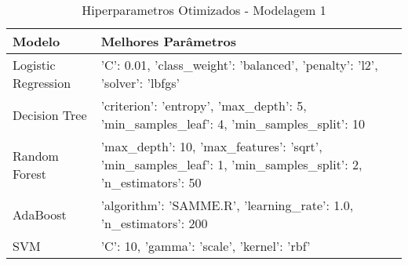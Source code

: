 \begin{table}[H] %
    \centering
    \caption{Hiperparametros Otimizados - Modelagem 1}
    \label{tab:melhores_parametros_otimizacao_modelagem_1}
    \renewcommand{\arraystretch}{1.25} %
    \begin{adjustwidth}{ -1in }{ -1in } %
    \centering %
    \small %
    \begin{tabular}{ll}
\toprule
             Modelo &                                                                                          Melhores Parâmetros \\
\midrule
Logistic Regression &                                  {'C': 0.01, 'class_weight': 'balanced', 'penalty': 'l2', 'solver': 'lbfgs'} \\
      Decision Tree &                     {'criterion': 'entropy', 'max_depth': 5, 'min_samples_leaf': 4, 'min_samples_split': 10} \\
      Random Forest & {'max_depth': 10, 'max_features': 'sqrt', 'min_samples_leaf': 1, 'min_samples_split': 2, 'n_estimators': 50} \\
           AdaBoost &                                          {'algorithm': 'SAMME.R', 'learning_rate': 1.0, 'n_estimators': 200} \\
                SVM &                                                                 {'C': 10, 'gamma': 'scale', 'kernel': 'rbf'} \\
\bottomrule
\end{tabular}
    \end{adjustwidth}
    \renewcommand{\arraystretch}{1.0} %
\end{table}
